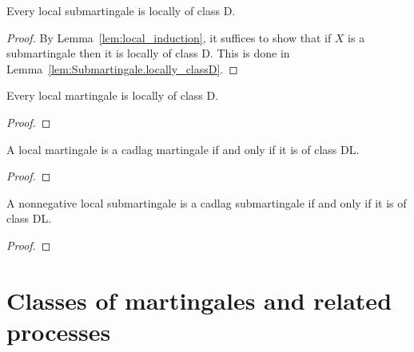 \begin{lemma}\label{lem:IsLocalSubmartingale.locally_classD}
  \leanok
Every local submartingale is locally of class D.
\end{lemma}

\begin{proof}
  \leanok
By Lemma~\ref{lem:local_induction}, it suffices to show that if $X$ is a submartingale then it is locally of class D.
This is done in Lemma~\ref{lem:Submartingale.locally_classD}.
\end{proof}


\begin{lemma}\label{lem:IsLocalMartingale.locally_classD}
  \notready
Every local martingale is locally of class D.
\end{lemma}

\begin{proof}

\end{proof}


\begin{lemma}\label{lem:IsLocalMartingale.martingale_iff_classDL}
  \notready
A local martingale is a cadlag martingale if and only if it is of class DL.
\end{lemma}

\begin{proof}

\end{proof}


\begin{lemma}\label{lem:IsLocalSubmartingale.submartingale_iff_classDL_of_nonnegative}
  \notready
A nonnegative local submartingale is a cadlag submartingale if and only if it is of class DL.
\end{lemma}

\begin{proof}

\end{proof}


\chapter{Classes of martingales and related processes}

